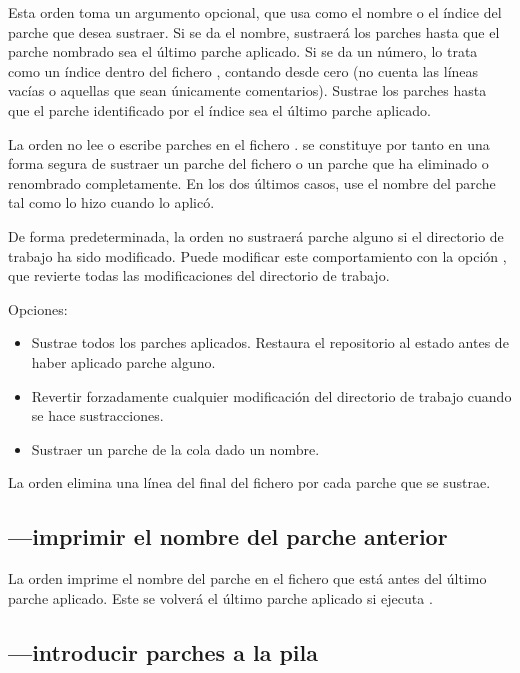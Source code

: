 Esta orden toma un argumento opcional, que usa como el nombre o el
índice del parche que desea sustraer.  Si se da el nombre, sustraerá
los parches hasta que el parche nombrado sea el último parche
aplicado.  Si se da un número,  lo trata como un
índice dentro del fichero ,  contando desde
cero (no cuenta las líneas vacías o aquellas que sean únicamente
comentarios).  Sustrae los parches hasta que el parche identificado
por el índice sea el último parche aplicado.

La orden  no lee o escribe parches en el fichero
.   se constituye por tanto en una
forma segura de sustraer un parche del fichero  o un
parche que ha eliminado o renombrado completamente.  En los dos
últimos casos, use el nombre del parche tal como lo hizo cuando lo
aplicó.

De forma predeterminada, la orden  no sustraerá
parche alguno si el directorio de trabajo ha sido modificado.  Puede
modificar este comportamiento con la opción , que
revierte todas las modificaciones del directorio de trabajo.

Opciones:
\begin{itemize}
\item[\hgxopt{mq}{qpop}{-a}] Sustrae todos los parches aplicados.
  Restaura el repositorio al estado antes de haber aplicado parche alguno.
\item[\hgxopt{mq}{qpop}{-f}] Revertir forzadamente cualquier
  modificación del directorio de trabajo cuando se hace sustracciones.
\item[\hgxopt{mq}{qpop}{-n}] Sustraer un parche de la cola dado un nombre.
\end{itemize}

La orden  elimina una línea del final del fichero
 por cada parche que se sustrae.

\subsection{---imprimir el nombre del parche anterior}

La orden  imprime el nombre del parche en el fichero
 que está antes del último parche aplicado.   Este
se volverá el último parche aplicado si ejecuta .

\subsection{---introducir parches a la pila}
\label{sec:mqref:cmd:qpush}

